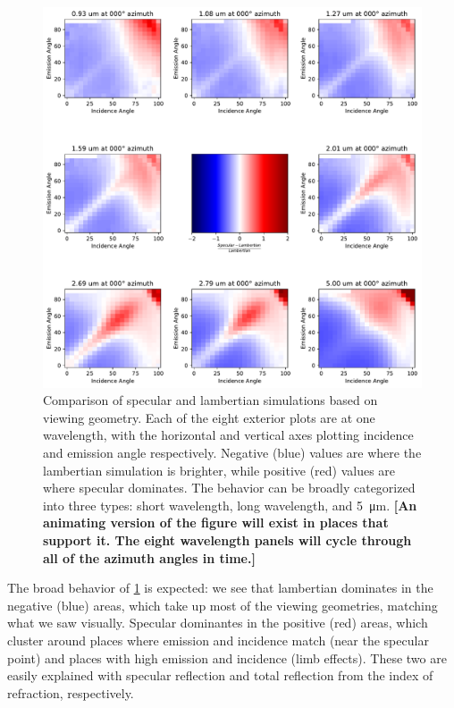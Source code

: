 \documentclass[linenumbers]{aastex631}
\begin{document}
\begin{figure}[htbp]
\includegraphics[scale = 0.44]{SpecLambNormDiff.pdf}
\centering
\caption{Comparison of specular and lambertian simulations based on viewing geometry. Each of the eight exterior plots are at one wavelength, with the horizontal and vertical axes plotting incidence and emission angle respectively. Negative (blue) values are where the lambertian simulation is brighter, while positive (red) values are where specular dominates. The behavior can be broadly categorized into three types: short wavelength, long wavelength, and \qty{5}{\micro\meter}. \textbf{\color{red} [An animating version of the figure will exist in places that support it. The eight wavelength panels will cycle through all of the azimuth angles in time.] \color{black}}}
\label{fig:10}
\end{figure}

The broad behavior of \ref{fig:10} is expected: we see that lambertian dominates in the negative (blue) areas, which take up most of the viewing geometries, matching what we saw visually. Specular dominantes in the positive (red) areas, which cluster around places where emission and incidence match (near the specular point) and places with high emission and incidence (limb effects). These two are easily explained with specular reflection and total reflection from the index of refraction, respectively.
\end{document}
